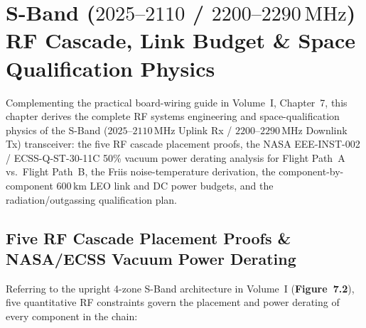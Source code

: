 \documentclass[10pt,a4paper]{article}
\renewcommand{\_}{\origunderscore\penalty0\hskip0pt\relax}
\numberwithin{equation}{section}
\numberwithin{table}{section}
\numberwithin{figure}{section}
\begin{document}
\newpage
\section{S-Band (\texorpdfstring{$2025\text{--}2110$ / $2200\text{--}2290\,\text{MHz}$}{2025-2110 / 2200-2290 MHz}) RF Cascade, Link Budget \& Space Qualification Physics}

Complementing the practical board-wiring guide in Volume~I, Chapter~7, this chapter derives the complete RF systems engineering and space-qualification physics of the S-Band ($2025\text{--}2110\,\text{MHz}$ Uplink Rx / $2200\text{--}2290\,\text{MHz}$ Downlink Tx) transceiver: the five RF cascade placement proofs, the NASA EEE-INST-002 / ECSS-Q-ST-30-11C 50\% vacuum power derating analysis for Flight Path~A vs.\ Flight Path~B, the Friis noise-temperature derivation, the component-by-component $600\,\text{km}$ LEO link and DC power budgets, and the radiation/outgassing qualification plan.

\subsection{Five RF Cascade Placement Proofs \& NASA/ECSS Vacuum Power Derating}
Referring to the upright 4-zone S-Band architecture in Volume~I (\textbf{Figure~7.2}), five quantitative RF constraints govern the placement and power derating of every component in the chain:
\end{document}
